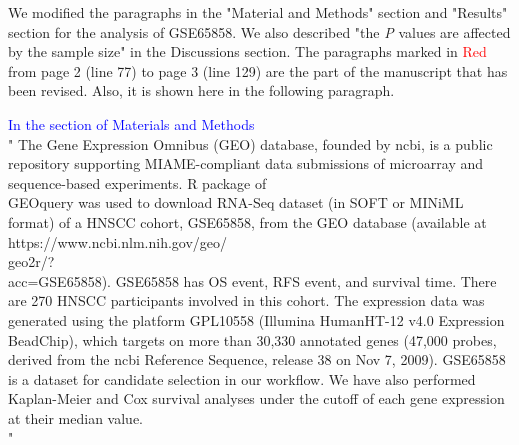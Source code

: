 \documentclass[preprint,12pt]{elsarticle}
\newenvironment{MyIndent}
{\par\leftskip1cm\relax\rightskip1cm\relax}
{\par\leftskip0cm\relax\rightskip0cm\relax}
\newenvironment{MyColorPar}[1]{%
    \leavevmode\color{#1}\ignorespaces%
}{%
}%
\begin{document}
\begin{MyColorPar}{blue}



We modified the paragraphs in the "Material and Methods" section and "Results" section for the analysis of GSE65858.
We also described "the \textit{P} values are affected by the sample size" in the Discussions section.
The paragraphs marked in \textcolor{red}{Red} from page 2 (line 77) to page 3 (line 129) are the part of the manuscript that has been revised. Also, it is shown here in the following paragraph.
\\[0.3cm]

\begin{MyIndent}
\begin{MyColorPar}{red}


\textcolor{blue}{In the section of Materials and Methods}\\
"
The Gene Expression Omnibus (GEO) database, founded by \acrfull{ncbi}, is a public repository supporting MIAME-compliant data submissions of microarray and sequence-based experiments.
R package of \\GEOquery\cite{Sean2007} was used to
download RNA-Seq dataset (in SOFT or MINiML format) of a HNSCC cohort, GSE65858, from the GEO database (available at https://www.ncbi.nlm.nih.gov/geo/\\geo2r/?\\acc=GSE65858). 
GSE65858\cite{Wichmann2015} has OS event, RFS event, and survival time.
There are 270 HNSCC participants involved in this cohort.
The expression data was generated using the platform GPL10558 (Illumina HumanHT-12 v4.0 Expression BeadChip), which targets on more than 30,330 annotated genes (47,000 probes, derived from the \acrshort{ncbi} Reference Sequence, release 38 on Nov 7, 2009). %
GSE65858 is a dataset for candidate selection in our workflow.
We have also performed Kaplan-Meier and Cox survival analyses under the cutoff of each gene expression at their median value.\\
"


\end{MyColorPar}
\end{MyIndent}
\end{MyColorPar}
\end{document}
